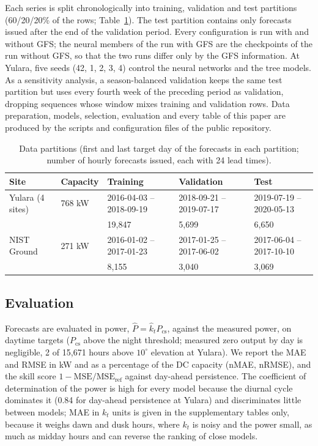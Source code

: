 Each series is split chronologically into training, validation and test partitions (60/20/20\%
of the rows; Table~\ref{tab:partitions}). The test partition contains only forecasts issued after
the end of the validation period. Every configuration is run with and without GFS; the neural
members of the run with GFS are the checkpoints of the run without GFS, so that the two runs
differ only by the GFS information. At Yulara, five seeds (42, 1, 2, 3, 4) control the neural
networks and the tree models. As a sensitivity analysis, a season-balanced validation keeps the
same test partition but uses every fourth week of the preceding period as validation, dropping
sequences whose window mixes training and validation rows. Data preparation, models, selection,
evaluation and every table of this paper are produced by the scripts and configuration files of
the public repository.

\begin{table}[t]
  \centering
  \caption{Data partitions (first and last target day of the forecasts in each partition;
  number of hourly forecasts issued, each with 24 lead times).}
  \label{tab:partitions}
  \small
  \begin{tabular}{lllll}
    \toprule
    Site & Capacity & Training & Validation & Test \\
    \midrule
    Yulara (4 sites) & 768 kW & 2016-04-03 -- 2018-09-19 & 2018-09-21 -- 2019-07-17 & 2019-07-19 -- 2020-05-13 \\
                     &        & 19{,}847 & 5{,}699 & 6{,}650 \\
    NIST Ground      & 271 kW & 2016-01-02 -- 2017-01-23 & 2017-01-25 -- 2017-06-02 & 2017-06-04 -- 2017-10-10 \\
                     &        & 8{,}155 & 3{,}040 & 3{,}069 \\
    \bottomrule
  \end{tabular}
\end{table}

\subsection{Evaluation}
\label{subsec:evaluation}

Forecasts are evaluated in power, $\hat P = \hat k_t P_\mathrm{cs}$, against the measured
power, on daytime targets ($P_\mathrm{cs}$ above the night threshold; measured zero output by day
is negligible, 2 of 15{,}671 hours above $10^\circ$ elevation at Yulara). We report the MAE and
RMSE in kW and as a percentage of the DC capacity (nMAE, nRMSE), and the skill score
$1 - \mathrm{MSE}/\mathrm{MSE}_\mathrm{ref}$ against day-ahead persistence. The coefficient of
determination of the power is high for every model because the diurnal cycle dominates it
(0.84 for day-ahead persistence at Yulara) and discriminates little between models; MAE in
$k_t$ units is given in the supplementary tables only, because it weighs dawn and dusk hours,
where $k_t$ is noisy and the power small, as much as midday hours and can reverse the ranking of
close models.

